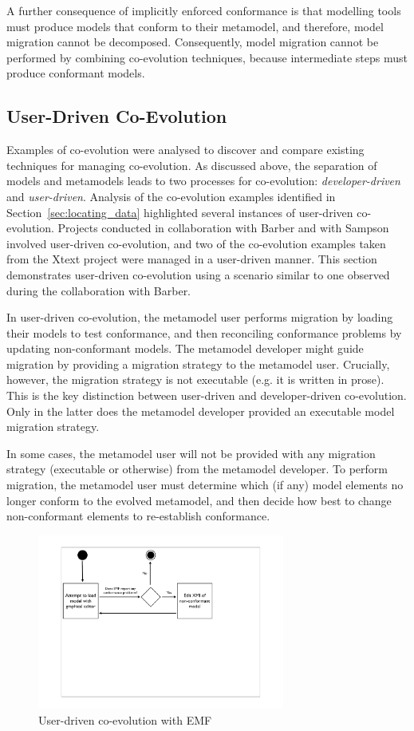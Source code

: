 A further consequence of implicitly enforced conformance is that modelling tools must produce models that conform to their metamodel, and therefore, model migration cannot be decomposed. Consequently, model migration cannot be performed by combining co-evolution techniques, because intermediate steps must produce conformant models.


\subsection{User-Driven Co-Evolution}
\label{subsec:user-driven_co-evolution}
Examples of co-evolution were analysed to discover and compare existing techniques for managing co-evolution. As discussed above, the separation of models and metamodels leads to two processes for co-evolution: \emph{developer-driven} and \emph{user-driven}. Analysis of the co-evolution examples identified in Section~\ref{sec:locating_data} highlighted several instances of user-driven co-evolution. Projects conducted in collaboration with Barber and with Sampson involved user-driven co-evolution, and two of the co-evolution examples taken from the Xtext project were managed in a user-driven manner. This section demonstrates user-driven co-evolution using a scenario similar to one observed during the collaboration with Barber.

In user-driven co-evolution, the metamodel user performs migration by loading their models to test conformance, and then reconciling conformance problems by updating non-conformant models. The metamodel developer might guide migration by providing a migration strategy to the metamodel user. Crucially, however, the migration strategy is not executable (e.g. it is written in prose). This is the key distinction between user-driven and developer-driven co-evolution. Only in the latter does the metamodel developer provided an executable model migration strategy.  

In some cases, the metamodel user will not be provided with any migration strategy (executable or otherwise) from the metamodel developer. To perform migration, the metamodel user must determine which (if any) model elements no longer conform to the evolved metamodel, and then decide how best to change non-conformant elements to re-establish conformance.

\begin{figure}[htbp]
	\centering
		\includegraphics*[viewport=80 280 600 550,height=5.75cm]{6.Evaluation/images/user_driven/emf_process.pdf}
	\caption{User-driven co-evolution with EMF}
	\label{fig:emf_process_analysis}
\end{figure}

